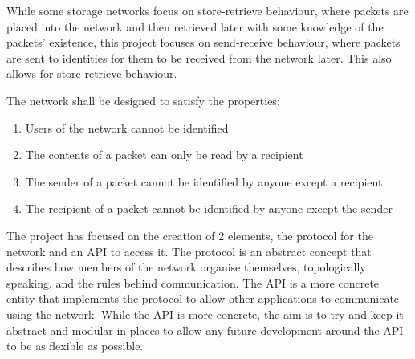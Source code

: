 	While some storage networks focus on store-retrieve behaviour, where packets are placed into the network and then retrieved later with some knowledge of the packets' existence, this project focuses on send-receive behaviour, where packets are sent to identities for them to be received from the network later. This also allows for store-retrieve behaviour.
	
	The network shall be designed to satisfy the properties:
	\begin{enumerate}[topsep=-5pt,itemsep=-1ex,partopsep=2ex,parsep=1.5ex]
		\item Users of the network cannot be identified
		\item The contents of a packet can only be read by a recipient
		\item The sender of a packet cannot be identified by anyone except a recipient
		\item The recipient of a packet cannot be identified by anyone except the sender
	\end{enumerate} \vspace{0.5ex}
	
	The project has focused on the creation of 2 elements, the protocol for the network and an API to access it. The protocol is an abstract concept that describes how members of the network organise themselves, topologically speaking, and the rules behind communication. The API is a more concrete entity that implements the protocol to allow other applications to communicate using the network. While the API is more concrete, the aim is to try and keep it abstract and modular in places to allow any future development around the API to be as flexible as possible.